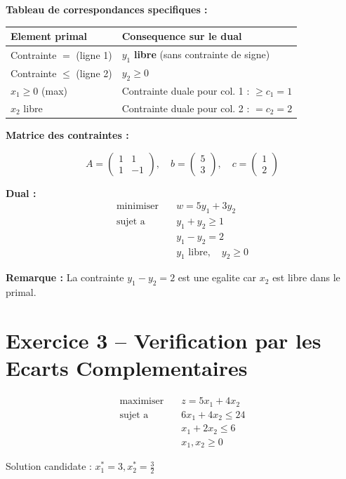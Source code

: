 \documentclass[12pt,a4paper]{article}
\begin{document}
\begin{correction}
\textbf{Tableau de correspondances specifiques :}

\begin{center}
\begin{tabular}{l|l}
\toprule
\textbf{Element primal} & \textbf{Consequence sur le dual} \\
\midrule
Contrainte $=$ (ligne 1) & $y_1$ \textbf{libre} (sans contrainte de signe) \\
Contrainte $\leq$ (ligne 2) & $y_2 \geq 0$ \\
$x_1 \geq 0$ (max) & Contrainte duale pour col. 1 : $\geq c_1 = 1$ \\
$x_2$ libre & Contrainte duale pour col. 2 : $= c_2 = 2$ \\
\bottomrule
\end{tabular}
\end{center}

\textbf{Matrice des contraintes :}

$$A = \begin{pmatrix} 1 & 1 \\ 1 & -1 \end{pmatrix}, \quad b = \begin{pmatrix} 5 \\ 3 \end{pmatrix}, \quad c = \begin{pmatrix} 1 \\ 2 \end{pmatrix}$$

\textbf{Dual :}
\begin{align*}
\text{minimiser} \quad & w = 5y_1 + 3y_2\\
\text{sujet a} \quad & y_1 + y_2 \geq 1\\
& y_1 - y_2 = 2\\
& y_1 \text{ libre}, \quad y_2 \geq 0
\end{align*}

\textbf{Remarque :} La contrainte $y_1 - y_2 = 2$ est une egalite car $x_2$ est libre dans le primal.
\end{correction}

\newpage
\section{Exercice 3 -- Verification par les Ecarts Complementaires}

\begin{enonce}
\begin{align*}
\text{maximiser} \quad & z = 5x_1 + 4x_2\\
\text{sujet a} \quad & 6x_1 + 4x_2 \leq 24\\
& x_1 + 2x_2 \leq 6\\
& x_1, x_2 \geq 0
\end{align*}

Solution candidate : $x_1^* = 3, x_2^* = \frac{3}{2}$
\end{enonce}
\end{document}
